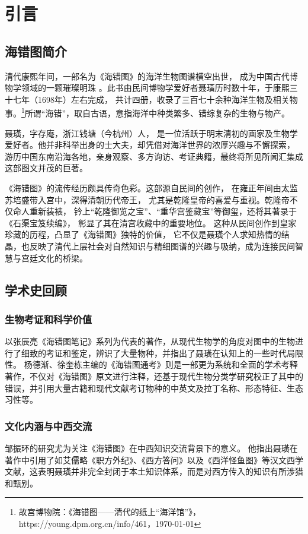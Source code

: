 \documentclass{source/Paper}
\begin{document}

\makeheader
\section{引言}
\subsection{海错图简介}
清代康熙年间，一部名为《海错图》的海洋生物图谱横空出世，
成为中国古代博物学领域的一颗璀璨明珠
。此书由民间博物学爱好者聂璜历时数十年，于康熙三十七年（1698年）左右完成，
共计四册，收录了三百七十余种海洋生物及相关物事。\footnote{故宫博物院：《\textlangle 海错图\textrangle ——清代的纸上“海洋馆”》， https://young.dpm.org.cn/info/461，\today}所谓“海错”，取自古语，意指海洋中种类繁多、错综复杂的生物与物产。

聂璜，字存庵，浙江钱塘（今杭州）人，
是一位活跃于明末清初的画家及生物学爱好者。他并非科举出身的士大夫，却凭借对海洋世界的浓厚兴趣与不懈探索，
游历中国东南沿海各地，亲身观察、多方询访、考证典籍，最终将所见所闻汇集成这部图文并茂的巨著。

《海错图》的流传经历颇具传奇色彩。这部源自民间的创作，
在雍正年间由太监苏培盛带入宫中，深得清朝历代帝王，
尤其是乾隆皇帝的喜爱与重视。乾隆帝不仅命人重新装裱，
钤上“乾隆御览之宝”、“重华宫鉴藏宝”等御玺，还将其著录于《石渠宝笈续编》，
彰显了其在清宫收藏中的重要地位。
这种从民间创作到皇家珍藏的历程，凸显了《海错图》独特的价值，
它不仅是聂璜个人求知热情的结晶，也反映了清代上层社会对自然知识与精细图谱的兴趣与吸纳，成为连接民间智慧与宫廷文化的桥梁。
\subsection{学术史回顾}
\subsubsection{生物考证和科学价值}
以张辰亮《海错图笔记》系列为代表的著作，从现代生物学的角度对图中的生物进行了细致的考证和鉴定，辨识了大量物种，并指出了聂璜在认知上的一些时代局限性。
杨德渐、徐奎栋主编的《\textlangle 海错图\textrangle 通考》则是一部更为系统和全面的学术考释著作，不仅对《海错图》原文进行注释，还基于现代生物分类学研究校正了其中的错误，并引用大量古籍和现代文献考订物种的中英文及拉丁名称、形态特征、生态习性等。
\subsubsection{文化内涵与中西交流}
邹振环的研究尤为关注《海错图》在中西知识交流背景下的意义。
他指出聂璜在著作中引用了如艾儒略《职方外纪》、《西方答问》以及《西洋怪鱼图》等汉文西学文献，这表明聂璜并非完全封闭于本土知识体系，而是对西方传入的知识有所涉猎和甄别。
\end{document}
